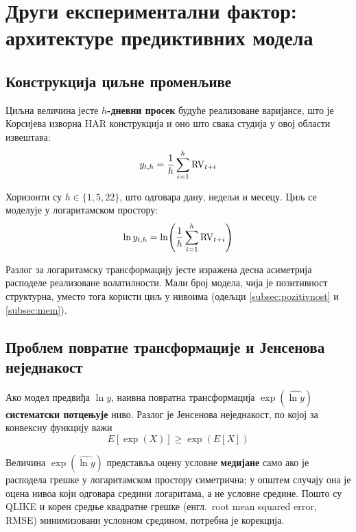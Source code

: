\section[Други експериментални фактор: архитектуре предиктивних модела]{Други експериментални фактор:\\ архитектуре предиктивних модела}
\label{sec:modeli}

\subsection{Конструкција циљне променљиве}
\label{subsec:target}

Циљна величина јесте \textbf{$h$-дневни просек} будуће реализоване варијансе, што је
Корсијева изворна HAR конструкција и оно што свака студија у овој области извештава:
\begin{equation}
y_{t,h} = \frac{1}{h}\sum_{i=1}^{h}\mathrm{RV}_{t+i}
\label{eq:target}
\end{equation}

Хоризонти су $h \in \{1, 5, 22\}$, што одговара дану, недељи и месецу. Циљ се моделује
у логаритамском простору:
\begin{equation}
\ln y_{t,h} = \ln\!\left(\frac{1}{h}\sum_{i=1}^{h}\mathrm{RV}_{t+i}\right)
\end{equation}

Разлог за логаритамску трансформацију јесте изражена десна асиметрија расподеле
реализоване волатилности. Мали број модела, чија је позитивност структурна, уместо
тога користи циљ у нивоима (одељци \ref{subsec:pozitivnost} и \ref{subsec:mem}).

\subsection{Проблем повратне трансформације и Јенсенова неједнакост}
\label{subsec:jensen}

Ако модел предвиђа $\ln y$, наивна повратна трансформација
$\exp(\widehat{\ln y})$ \textbf{систематски потцењује} ниво. Разлог је Јенсенова
неједнакост, по којој за конвексну функцију важи
\begin{equation}
E\!\left[\exp(X)\right] \ge \exp\!\left(E[X]\right)
\end{equation}

Величина $\exp(\widehat{\ln y})$ представља оцену условне \textbf{медијане} само ако
је расподела грешке у логаритамском простору симетрична; у општем случају она је
оцена нивоа који одговара средини логаритама, а не условне средине. Пошто су QLIKE и
корен средње квадратне грешке (енгл.\ root mean squared error, RMSE) минимизовани
условном средином, потребна је
корекција.

